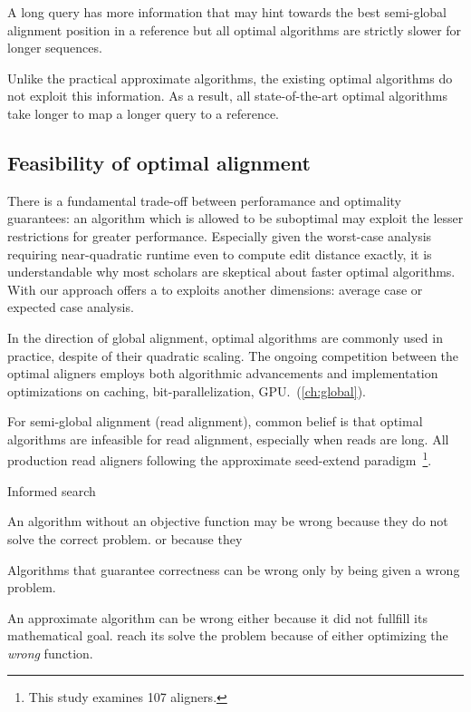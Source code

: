 \begin{paradox}
A long query has more information that may hint towards the best semi-global
alignment position in a reference but all optimal algorithms are strictly slower
for longer sequences.
\end{paradox}

Unlike the practical approximate algorithms, the existing optimal algorithms do
not exploit this information. As a result, all state-of-the-art optimal
algorithms take longer to map a longer query to a reference. 

\subsection*{Feasibility of optimal alignment}

There is a fundamental trade-off between perforamance and optimality guarantees:
an algorithm which is allowed to be suboptimal may exploit the lesser
restrictions for greater performance. Especially given the worst-case analysis
requiring near-quadratic runtime even to compute edit distance exactly, it is
understandable why most scholars are skeptical about faster optimal algorithms.
With our \A approach  offers a to exploits another dimensions: average case or expected case analysis.


In the direction of global alignment, optimal algorithms are commonly used in
practice, despite of their quadratic scaling. The ongoing competition between
the optimal aligners employs both algorithmic advancements and implementation
optimizations on caching, bit-parallelization, GPU.~(\cref{ch:global}).

For semi-global alignment (read alignment), common belief is that optimal
algorithms are infeasible for read alignment, especially when reads are long.
All production read aligners following the approximate seed-extend
paradigm~\cite{alser2021technology}\footnote{This study examines 107 aligners.}.

Informed search

An algorithm without an objective function may be wrong because they do not
solve the correct problem. or because they 

Algorithms that guarantee correctness can be wrong only by being given a wrong problem.

An approximate algorithm can be wrong either because it did not fullfill its
mathematical goal. reach its solve the problem because of either optimizing the
\emph{wrong} function.

